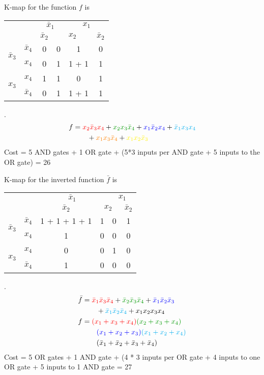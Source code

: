 \documentclass{article}
\newcommand{\bx}{\bar{x}}
\newcommand{\cred}{\color{red}}
\newcommand{\cg}{\color{green!60!black}}
\newcommand{\cb}{\color{blue}}
\begin{document}
K-map for the function $f$ is
\\
\begin{tabular}{c|c|c|c|c|c}
  \toprule
  && \multicolumn{2}{c|}{$\bx_1$} & \multicolumn{2}{c}{$x_1$}
  \\
  && $\bx_2$ & \multicolumn{2}{c|}{$x_2$} & $\bx_2$
  \\ \midrule
  \multirow{2}{*}{$\bx_3$} & $\bx_4$
                                  & 0 & 0 &  \color{yellow} 1 & 0
  \\
  & $x_4$
                                  & 0 & \cred 1 & \cred 1 + \color{yellow} 1 & \cb 1
  \\
  \multirow{2}{*}{$x_3$}   &  $x_4$
                                  & \color{cyan} 1 & \color{cyan} 1 & 0 & \cb 1
  \\
  & $\bx_4$
                                  & 0 & \cg 1 & \cg 1 + \color{orange} 1 & \color{orange} 1
  \\\bottomrule
\end{tabular}.
\\
\begin{align*}
f &= { \cred x_2 \bx_3 x_4 } +  { \cg x_2 x_3 \bx_4} + {\cb x_1 \bx_2 x_4} +
  {\color{cyan} \bx_1 x_3 x_4 }
  \\
  &\qquad + {\color{orange} x_1 x_3 \bx_4} +
{\color{yellow} x_1 x_2 \bx_3 }
  \end{align*}
 Cost = 5 AND gates + 1 OR gate + (5*3 inputs per AND gate + 5 inputs to the OR
 gate) = 26

 K-map for the inverted function $\bar{f}$ is
 \\
 \begin{tabular}{c|c|c|c|c|c}
   \toprule
   && \multicolumn{2}{c|}{$\bx_1$} & \multicolumn{2}{c}{$x_1$}
   \\
   && $\bx_2$ & \multicolumn{2}{c|}{$x_2$} & $\bx_2$
   \\ \midrule
   \multirow{2}{*}{$\bx_3$} & $\bx_4$
                                   & \cred 1 + \cg 1 + \cb 1 + \color{cyan} 1 & \cred 1 &  0 &  \cg 1
   \\
   & $x_4$
                                   & \cb 1 & 0 & 0 & 0
   \\
   \multirow{2}{*}{$x_3$}   &  $x_4$
                                   & 0 & 0 & 1 & 0
   \\
   & $\bx_4$
                                   & \color{cyan} 1 & 0 & 0 & 0
   \\\bottomrule
 \end{tabular}.
 \\
 \begin{align*}
   \bar{f} &= {\cred \bx_1 \bx_3 \bx_4 } + {\cg \bx_2 \bx_3 \bx_4} + {\cb \bx_1 \bx_2 \bx_3 }
   \\
   &\qquad + {\color{cyan} \bx_1 \bx_2 \bx_4 } + x_1 x_2 x_3 x_4
   \\
   f &= {\cred (x_1 + x_3 + x_4) } {\cg (x_2 + x_3 + x_4)} 
   \\
           &\qquad {\cb (x_1 + x_2 + x_3)}{\color{cyan} (x_1 + x_2 + x_4)}
   \\
   &\qquad (\bx_1 + \bx_2+ \bx_3 + \bx_4)
 \end{align*}
 Cost = 5 OR gates + 1 AND gate + (4 * 3 inputs per OR gate + 4 inputs to one OR
 gate + 5 inputs to 1 AND gate = 27
\end{document}

